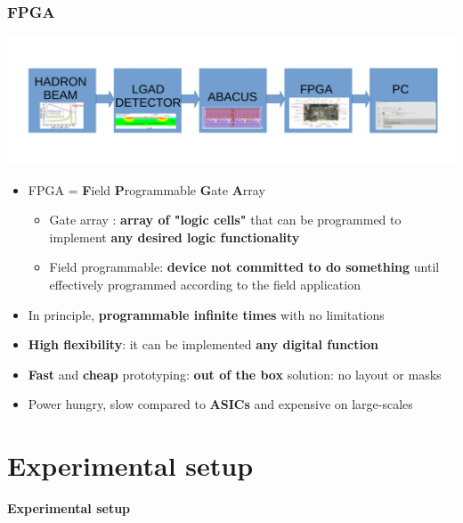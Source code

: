 \documentclass[aspectratio=169]{beamer}
\begin{document}
		\begin{frame}
	\frametitle{FPGA}
	\begin{center}
		\includegraphics[width=0.7 \textwidth]{IMG/Block_Diagram.pdf}
	\end{center}
		\begin{itemize}
			\item FPGA = \textbf{F}ield \textbf{P}rogrammable \textbf{G}ate \textbf{A}rray
			\begin{itemize}
				\item Gate array : \textbf{array of "logic cells"} that can be programmed to implement \textbf{any desired logic functionality}
				\item Field programmable: \textbf{device not committed to do something} until effectively programmed according to the field application
			\end{itemize}
			\item In principle, \textbf{programmable infinite times} with no limitations
			\item \textbf{High flexibility}: it can be implemented \textbf{any digital function}
			\item \textbf{Fast} and \textbf{cheap} prototyping: \textbf{out of the box} solution: no layout or masks
			\item {\color{orange} Power hungry, slow compared to \textbf{ASICs} and expensive on large-scales}
		\end{itemize}
	\end{frame}

	
\section{Experimental setup}

\begin{frame}
\begin{center}
	{\Huge {}\selectfont \color{blue} \textbf{Experimental setup}}
\end{center}
\end{frame}
\end{document}

